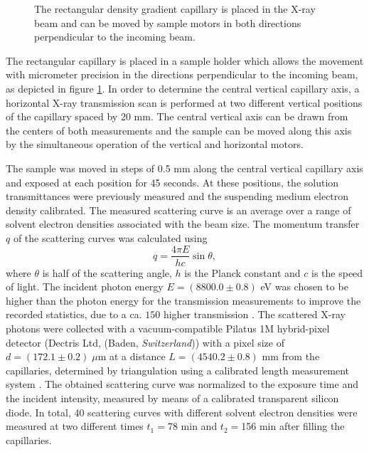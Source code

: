 \begin{figure}%
	\centering
		
		\caption{The rectangular density gradient capillary is placed in the X-ray beam and can be moved by sample motors in both directions perpendicular to the incoming beam.}
		\label{fig:DensityGradientCapillarySetup}
\end{figure}

The rectangular capillary is placed in a sample holder which allows the movement with micrometer precision in the directions perpendicular to the incoming beam, as depicted in figure \ref{fig:DensityGradientCapillarySetup}. In order to determine the central vertical capillary axis, a horizontal X-ray transmission scan is performed at two different vertical positions of the capillary spaced by 20 mm. The central vertical axis can be drawn from the centers of both measurements and the sample can be moved along this axis by the simultaneous operation of the vertical and horizontal motors.

The sample was moved in steps of 0.5 mm along the central vertical capillary axis and exposed at each position for 45 seconds. At these positions, the solution transmittances were previously measured and the suspending medium electron density calibrated. The measured scattering curve is an average over a range of solvent electron densities associated with the beam size. The momentum transfer \(q\) of the scattering curves was calculated using
\begin{equation}
q=\frac{4\pi E}{hc}\sin\theta ,
\end{equation}
where \(\theta\) is half of the scattering angle, \(h\) is the Planck constant and \(c\) is the speed of light. The incident photon energy \(E = \left(8800.0  \pm 0.8\right)\) eV was chosen to be higher than the photon energy for the transmission measurements to improve the recorded statistics, due to a ca. \(150\) higher transmission \cite{henke_x-ray_1993}. The scattered X-ray photons were collected with a vacuum-compatible Pilatus 1M hybrid-pixel detector (Dectris Ltd, (Baden, \emph{Switzerland})) with a pixel size of \(d = \left(172.1  \pm 0.2\right) \; \mu \)m at a distance \(L = \left(4540.2  \pm 0.8\right)\) mm from the capillaries, determined by triangulation using a calibrated length measurement system \cite{wernecke_characterization_2014}. The obtained scattering curve was normalized to the exposure time and the incident intensity, measured by means of a calibrated transparent silicon diode.  In total, 40 scattering curves with different solvent electron densities were measured at two different times \(t_1=\)78 min and \(t_2=\)156 min after filling the capillaries.


